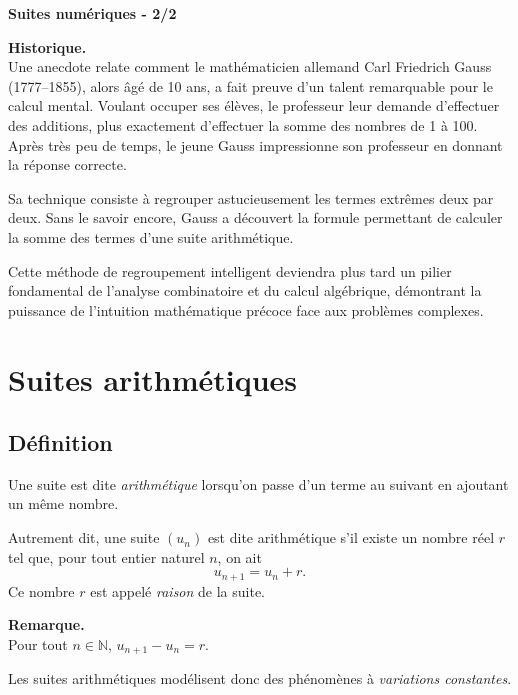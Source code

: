 \documentclass[11pt]{article}
\newcommand{\NN}{\mathbb{N}}
\newenvironment{remarque}{\par\smallskip\noindent\textbf{Remarque. \\}\ignorespaces}{\par\smallskip}
\newenvironment{historique}{\par\smallskip\noindent\textbf{Historique. \\}\ignorespaces}{\par\smallskip}
\begin{document}
\begin{definition}
\begin{center}
    {\Huge\bfseries Suites numériques - 2/2}
\end{center}
\end{definition}

\begin{historique}
Une anecdote relate comment le mathématicien allemand Carl Friedrich Gauss (1777--1855), alors âgé de 10 ans, a fait preuve d'un talent remarquable pour le calcul mental. Voulant occuper ses élèves, le professeur leur demande d'effectuer des additions, plus exactement d'effectuer la somme des nombres de 1 à 100. Après très peu de temps, le jeune Gauss impressionne son professeur en donnant la réponse correcte.

Sa technique consiste à regrouper astucieusement les termes extrêmes deux par deux. Sans le savoir encore, Gauss a découvert la formule permettant de calculer la somme des termes d'une suite arithmétique.

Cette méthode de regroupement intelligent deviendra plus tard un pilier fondamental de l'analyse combinatoire et du calcul algébrique, démontrant la puissance de l'intuition mathématique précoce face aux problèmes complexes.
\end{historique}

\section{Suites arithmétiques}

\subsection{Définition}

\begin{definition}
Une suite est dite \emph{arithmétique} lorsqu'on passe d'un terme au suivant en ajoutant un même nombre.

Autrement dit, une suite $(u_n)$ est dite arithmétique s'il existe un nombre réel $r$ tel que, pour tout entier naturel $n$, on ait
\[
u_{n+1}=u_n+r.
\]
Ce nombre $r$ est appelé \emph{raison} de la suite.
\end{definition}

\begin{remarque}
Pour tout $n\in\NN$, $u_{n+1}-u_n=r$.

Les suites arithmétiques modélisent donc des phénomènes à \emph{variations constantes}.
\end{remarque}
\end{document}
